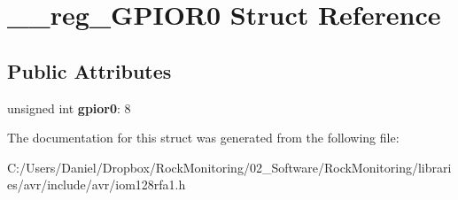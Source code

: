 \hypertarget{struct____reg___g_p_i_o_r0}{}\section{\+\_\+\+\_\+reg\+\_\+\+G\+P\+I\+O\+R0 Struct Reference}
\label{struct____reg___g_p_i_o_r0}
\subsection*{Public Attributes}
\begin{DoxyCompactItemize}
\item 
unsigned int {\bfseries gpior0}\+: 8\hypertarget{struct____reg___g_p_i_o_r0_ad7caf2a17913f63b879623ca368b27a8}{}\label{struct____reg___g_p_i_o_r0_ad7caf2a17913f63b879623ca368b27a8}

\end{DoxyCompactItemize}


The documentation for this struct was generated from the following file\+:\begin{DoxyCompactItemize}
\item 
C\+:/\+Users/\+Daniel/\+Dropbox/\+Rock\+Monitoring/02\+\_\+\+Software/\+Rock\+Monitoring/libraries/avr/include/avr/iom128rfa1.\+h\end{DoxyCompactItemize}
